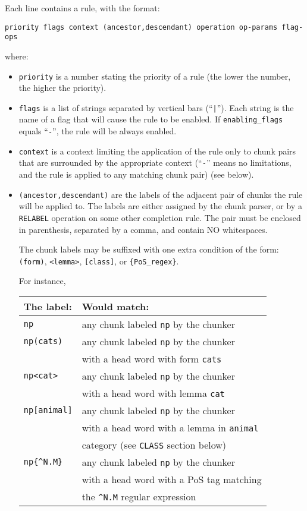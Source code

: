 \documentclass[a4paper]{book}
\begin{document}
    Each line contains a rule, with the format:
\begin{verbatim}
priority flags context (ancestor,descendant) operation op-params flag-ops
\end{verbatim}
  where:
  \begin{itemize}
    \item \verb#priority# is a number stating the priority of a rule
      (the lower the number, the higher the priority).

    \item\verb#flags# is a list of strings separated by vertical bars
      (``\verb#|#'').  Each string is the name of a flag that will
      cause the rule to be enabled.  If \verb#enabling_flags# equals
      ``\verb#-#'', the rule will be always enabled.

    \item \verb#context# is a context limiting the application of the
      rule only to chunk pairs that are surrounded by the appropriate
      context (``\verb#-#'' means no limitations, and the rule is applied to
      any matching chunk pair) (see below).

    \item \verb#(ancestor,descendant)# are the labels of the adjacent pair of
    chunks the rule will be applied to. The labels are either assigned by
    the chunk parser, or by a \verb#RELABEL# operation on some other completion rule.
    The pair must be enclosed in parenthesis, separated by a comma, and 
    contain NO whitespaces.

    The chunk labels may be suffixed with one extra condition of the form:
    \verb#(form)#, \verb#<lemma>#, \verb#[class]#, or \verb#{PoS_regex}#.

    For instance,
 
    \begin{tabular}{|l|l|}
    The label: & Would match: \\ \hline\hline
    \verb#np#  & any chunk labeled \verb#np# by the chunker \\ \hline
    \verb#np(cats)# & any chunk labeled \verb#np# by the chunker \\
                    & with a head word with form \verb#cats# \\ \hline
    \verb#np<cat>#  & any chunk labeled \verb#np# by the chunker \\
                    & with a head word with lemma \verb#cat# \\ \hline
    \verb#np[animal]# & any chunk labeled \verb#np# by the chunker \\
                      & with a head word with a lemma in \verb#animal# \\
                      & category (see \verb#CLASS# section below) \\ \hline
    \verb#np{^N.M}# & any chunk labeled \verb#np# by the chunker \\
                    & with a head word with a PoS tag matching \\
                    & the \verb#^N.M# regular expression\\ \hline
    \end{tabular}


\end{itemize}
\end{document}
